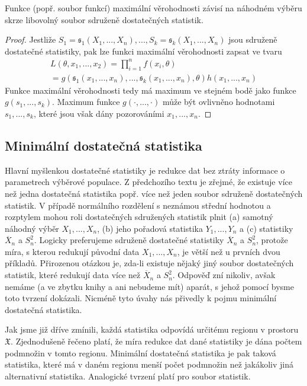 \begin{theorem}
Funkce (popř. soubor funkcí) maximální věrohodnosti závisí na náhodném výběru skrze libovolný soubor sdruženě dostatečných statistik.
\end{theorem}

\begin{proof}
Jestliže $S_1 = \mathfrak{s}_1(X_1, ..., X_n), ..., S_k = \mathfrak{s}_k(X_1, ..., X_n)$ jsou sdruženě dostatečné statistiky, pak lze funkci maximální věrohodnosti zapsat ve tvaru
\begin{gather*}
L(\theta, x_1, ..., x_2) = \prod_{i = 1}^n f(x_i, \theta)\\
= g(\mathfrak{s}_1(x_1, ..., x_n), ..., \mathfrak{s}_k(x_1, ..., x_n), \theta)h(x_1, ..., x_n)
\end{gather*}
Funkce maximální věrohodnosti tedy má maximum ve stejném bodě jako funkce $g(s_1, ..., s_k)$. Maximum funkce $g(\cdot, ..., \cdot)$ může být ovlivněno hodnotami $s_1, ..., s_k$, které jsou však dány pozorováními $x_1, ..., x_n$.
\end{proof}

\subsection{Minimální dostatečná statistika}

Hlavní myšlenkou dostatečné statistiky je redukce dat bez ztráty informace o parametrech výběrové populace. Z předchozího textu je zřejmé, že existuje více než jedna dostatečná statistika popř. více než jeden soubor sdruženě dostatečných statistik. V případě normálního rozdělení s neznámou střední hodnotou a rozptylem mohou roli dostatečných sdružených statistik plnit (a) samotný náhodný výběr $X_1, ..., X_n$, (b) jeho pořadová statistika $Y_1, ..., Y_n$ a (c) statistiky $\overline{X}_n$ a $S_n^2$. Logicky preferujeme sdruženě dostatečné statistiky $\overline{X}_n$ a $S_n^2$, protože míra, s kterou redukují původní data $X_1, ..., X_n$, je větší než u prvních dvou příkladů. Přirozenou otázkou je, zda-li existuje nějaký jiný soubor dostatečných statistik, které redukují data více než $\overline{X}_n$ a $S_n^2$. Odpověď zní nikoliv, avšak nemáme (a ve zbytku knihy a ani nebudeme mít) aparát, s jehož pomocí bysme toto tvrzení dokázali. Nicméně tyto úvahy nás přivedly k pojmu minimální dostatečná statistika.

Jak jsme již dříve zmínili, každá statistika odpovídá určitému regionu v prostoru $\mathfrak{X}$. Zjednodušeně řečeno platí, že míra redukce dat dané statistiky je dána počtem podmnožin v tomto regionu. Minimální dostatečná statistika je pak taková statistika, které má v daném regionu menší počet podmnožin než jakákoliv jiná alternativní statistika. Analogické tvrzení platí pro soubor statistik.

